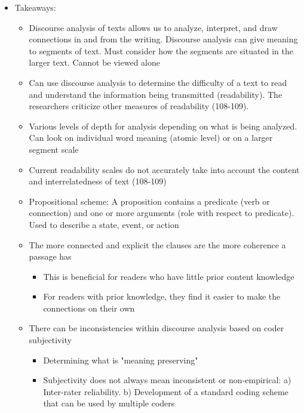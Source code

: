 \documentclass{TC}
\begin{document}
\begin{itemize}
\item Takeaways: 
	\begin{itemize}
	\item Discourse analysis of texts allows us to analyze, interpret, and draw connections in and from the writing. Discourse analysis can give meaning to segments of text. Must consider how the segments are situated in the larger text. Cannot be viewed alone
	\item Can use discourse analysis to determine the difficulty of a text to read and understand the information being transmitted (readability). The researchers criticize other measures of readability (108-109). 
	\item Various levels of depth for analysis depending on what is being analyzed. Can look on individual word meaning (atomic level) or on a larger segment scale
	\item Current readability scales do not accurately take into account the content and interrelatedness of text (108-109)
	\item Propositional scheme: A proposition contains a predicate (verb or connection) and one or more arguments (role with respect to predicate). Used to describe a state, event, or action
	\item The more connected and explicit the clauses are the more coherence a passage has
		\begin{itemize}
		\item This is beneficial for readers who have little prior content knowledge
		\item For readers with prior knowledge, they find it easier to make the connections on their own
		\end{itemize}
	\item There can be inconsistencies within discourse analysis based on coder subjectivity
		\begin{itemize}
		\item Determining what is "meaning preserving"
		\item Subjectivity does not always mean inconsistent or non-empirical: a) Inter-rater reliability. b) Development of a standard coding scheme that can be used by multiple coders
		\end{itemize}



\end{itemize}
\end{itemize}
\end{document}
